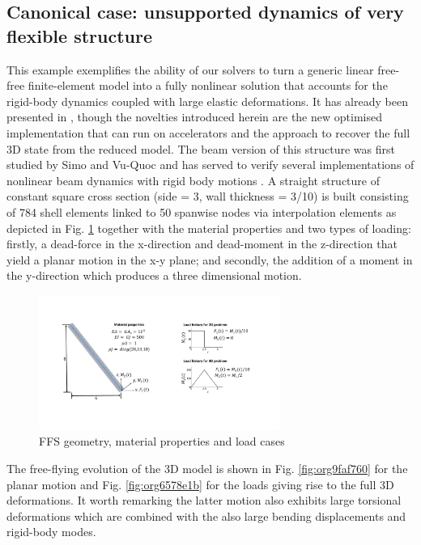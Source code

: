 \documentclass[11pt]{article}
\begin{document}
\subsection{Canonical case: unsupported dynamics of very flexible structure}
\label{sec:orge08446a}
This example exemplifies the ability of our solvers to turn a generic linear free-free finite-element model into a fully nonlinear solution that accounts for the rigid-body dynamics coupled with large elastic deformations. It has already been presented in \cite{PALACIOS2019}, though the novelties introduced herein are the new optimised implementation that can run on accelerators and the approach to recover the full 3D state from the reduced model.
The beam version of this structure was first studied by Simo and Vu-Quoc \cite{SIMO1988} and has served to verify several implementations of nonlinear beam dynamics with rigid body motions \cite{HESSE2014}.
A straight structure of constant square cross section (side = 3, wall thickness = 3/10) is built consisting of 784 shell elements linked to 50 spanwise nodes via interpolation elements as depicted in Fig. \ref{fig:org248a372} together with the material properties and two types of loading: firstly, a dead-force in the x-direction and dead-moment in the z-direction that yield a planar motion in the x-y plane; and secondly, the addition of a moment in the y-direction which produces a three dimensional motion.

\begin{figure}[htbp]
\centering
\includegraphics[width=0.7\textwidth]{figs_ext/ffbw10.pdf}
\caption{\label{fig:org248a372}FFS geometry, material properties and load cases}
\end{figure}

The free-flying evolution of the 3D model is shown in Fig. \ref{fig:org9faf760} for the planar motion and Fig. \ref{fig:org6578e1b} for the loads giving rise to the full 3D deformations. It worth remarking the latter motion also exhibits large torsional deformations which are combined with the also large bending displacements and rigid-body modes.
\end{document}
